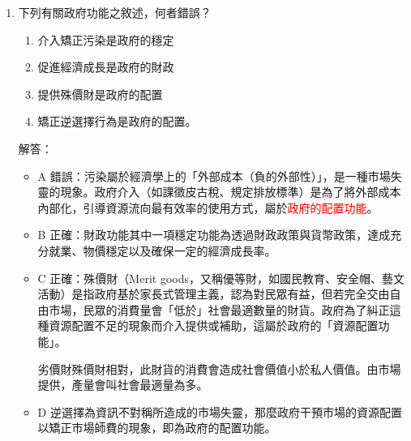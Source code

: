 \documentclass[12pt, a4paper]{article}
\begin{document}
\begin{enumerate}
        完全競爭市場符合全面效率：
        在完全競爭市場下，商品價格（產品需求曲線）會等於其邊際成本（產品供給曲線），因此，$P_X = MC_X, P_Y = MC_Y$，故 $\frac{P_X}{P_Y} = \frac{MC_X}{MC_Y}$。\\
        由於 $MRS_{XY} = \frac{P_X}{P_Y}$，$MRT_{XY} = \frac{MC_X}{MC_Y}$，此時，$MRS_{XY} = MRT_{XY}$，達到全面效率，兩產品的邊際替代率等於生產的邊際效率。
        \begin{itemize}
            \item \(MRS_{XY} = 2/3\) 的經濟意義是：消費者主觀上願意為了多獲得 1 單位的 X，放棄 \(2/3\) 單位的 Y。（這代表 X 對消費者的主觀價值）
            \item \(MRT_{XY} = 3/4\) 的經濟意義是：在生產技術上，社會為了多生產 1 單位的 X，必須放棄 \(3/4\) 單位的 Y，也就是客觀的邊際生產成本。（這代表 X 的客觀生產成本）
            \item 比較兩者：生產 1 單位 X 的社會成本（放棄 \(3/4\) 個 Y）大於消費者對它的主觀評價（只願意放棄 \(2/3\) 個 Y，因為 \(3/4 > 2/3\)）。這意味著社會目前生產了太多的 X 財貨。
        \end{itemize}

    \item 下列有關政府功能之敘述，何者錯誤？
        \begin{enumerate}[label=\Alph*.]
            \item 介入矯正污染是政府的穩定
            \item 促進經濟成長是政府的財政
            \item 提供殊價財是政府的配置
            \item 矯正逆選擇行為是政府的配置。
        \end{enumerate}
        解答：
        \begin{itemize}
            \item A 錯誤：污染屬於經濟學上的「外部成本（負的外部性）」，是一種市場失靈的現象。政府介入（如課徵皮古稅、規定排放標準）是為了將外部成本內部化，引導資源流向最有效率的使用方式，屬於\textcolor{red}{政府的配置功能}。
            \item B 正確：財政功能其中一項穩定功能為透過財政政策與貨幣政策，達成充分就業、物價穩定以及確保一定的經濟成長率。
            \item C 正確：殊價財（Merit goods，又稱優等財，如國民教育、安全帽、藝文活動）是指政府基於家長式管理主義，認為對民眾有益，但若完全交由自由市場，民眾的消費量會「低於」社會最適數量的財貨。政府為了糾正這種資源配置不足的現象而介入提供或補助，這屬於政府的「資源配置功能」。

            劣價財殊價財相對，此財貨的消費會造成社會價值小於私人價值。由市場提供，產量會叫社會最適量為多。
            \item D 逆選擇為資訊不對稱所造成的市場失靈，那麼政府干預市場的資源配置以矯正市場師費的現象，即為政府的配置功能。
        \end{itemize}

\end{enumerate}
\end{document}
